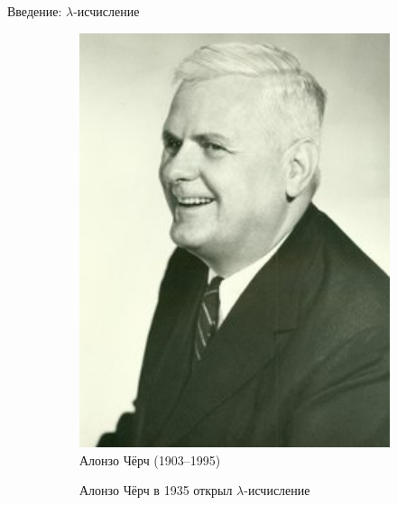 

\newcommand{\tb}[1]{\textcolor{blue}{#1}}
\newcommand{\tr}[1]{\textcolor{red}{#1}}

\begin{frame}{Введение: $\lambda$-исчисление}
  \begin{figure}
    \centering
    \begin{subfigure}[t]{0.45\textwidth}
      \begin{minipage}{0.7\textwidth}
      \includegraphics[width=1\textwidth]{220px-Alonzo_Church.jpg}\\
            Алонзо Чёрч (1903--1995)
      \end{minipage}
    \end{subfigure}
    \begin{subfigure}[t]{0.45\textwidth}
      \vspace{-5em}   %
  Алонзо Чёрч в 1935   открыл $\lambda$-исчисление
\vspace{1em}


\end{subfigure}
\end{figure}
\end{frame}

